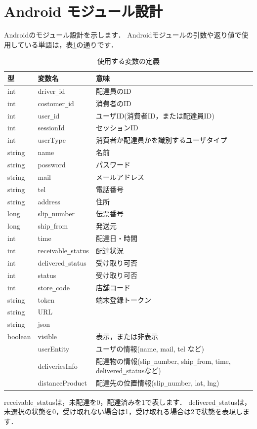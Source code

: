 \documentclass[a4j,titlepage]{jarticle}
\begin{document}
\section{Android モジュール設計}
Androidのモジュール設計を示します．
Androidモジュールの引数や返り値で使用している単語は，表\ref{androidTable}の通りです．
\begin{table}[htb]
\centering
\caption{使用する変数の定義}
\label{androidTable}
\begin{tabular}{|lll|}
\hline
型 & 変数名 & 意味      \\ \hline
int & driver\verb|_|id & 配達員のID     \\
int & costomer\verb|_|id & 消費者のID     \\
int & user\verb|_|id & ユーザID(消費者ID，または配達員ID)     \\
int & sessionId & セッションID     \\
int & userType & 消費者か配達員かを識別するユーザタイプ     \\
string  & name  & 名前     \\
string & possword & パスワード     \\
string & mail & メールアドレス     \\
string & tel & 電話番号     \\
string & address & 住所     \\
long  &  slip\verb|_|number  & 伝票番号   \\
long & ship\verb|_|from & 発送元     \\
int & time & 配達日・時間     \\
int & receivable\verb|_|status & 配達状況    \\
int & delivered\verb|_|status  &  受け取り可否  \\
int & status  &  受け取り可否  \\
int & store\verb|_|code & 店舗コード     \\
string & token & 端末登録トークン \\
string & URL &  \\
string & json &  \\
boolean & visible  &  表示，または非表示  \\
& userEntity  &  ユーザの情報(name, mail, tel など)  \\
& deliveriesInfo  &  配達物の情報(slip\verb|_|number, ship\verb|_|from, time, delivered\verb|_|statusなど)  \\
 & distanceProduct & 配達先の位置情報(slip\verb|_|number, lat, lng)  \\\hline
\end{tabular}
\end{table}
receivable\verb|_|statusは，未配達を0，配達済みを1で表します．
delivered\verb|_|statusは，未選択の状態を0，受け取れない場合は1，受け取れる場合は2で状態を表現します．
\end{document}
